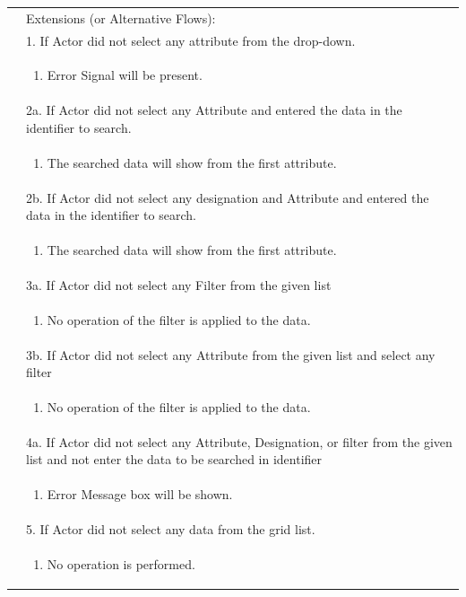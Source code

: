 \documentclass[12pt,a4paper]{report}
\begin{document}
\begin{tabular}{ | m{3cm} | m{12cm}| } \hline

&Extensions (or Alternative Flows):\\

& 1. If Actor did not select any attribute from the drop-down. \\
& \begin{enumerate}
		\item Error Signal will be present.
	\end{enumerate}
\\ 

& 2a. If Actor did not select any Attribute and entered the data in the identifier to search. \\
& \begin{enumerate}
		\item The searched data will show from the first attribute.
	\end{enumerate}
\\ 
& 2b. If Actor did not select any designation and  Attribute and entered the data in the identifier to search. \\
& \begin{enumerate}
		\item The searched data will show from the first attribute.
	\end{enumerate}
\\ 

& 3a. If Actor did not select any Filter from the given list \\
& \begin{enumerate}
		\item No operation of the filter is applied to the data.
	\end{enumerate}
\\ 
& 3b. If Actor did not select any Attribute from the given list and select any filter  \\
& \begin{enumerate}
		\item No operation of the filter is applied to the data.
	\end{enumerate}
\\ 

& 4a. If Actor did not select any Attribute, Designation, or filter from the given list and not enter the data to be searched in identifier \\
& \begin{enumerate}
		\item Error Message box will be shown.
	\end{enumerate}
\\  
& 5. If Actor did not select any data from the grid list.  \\
& \begin{enumerate}
		\item No operation is performed.
	\end{enumerate}
\\ \hline  
\end{tabular}
\end{document}
